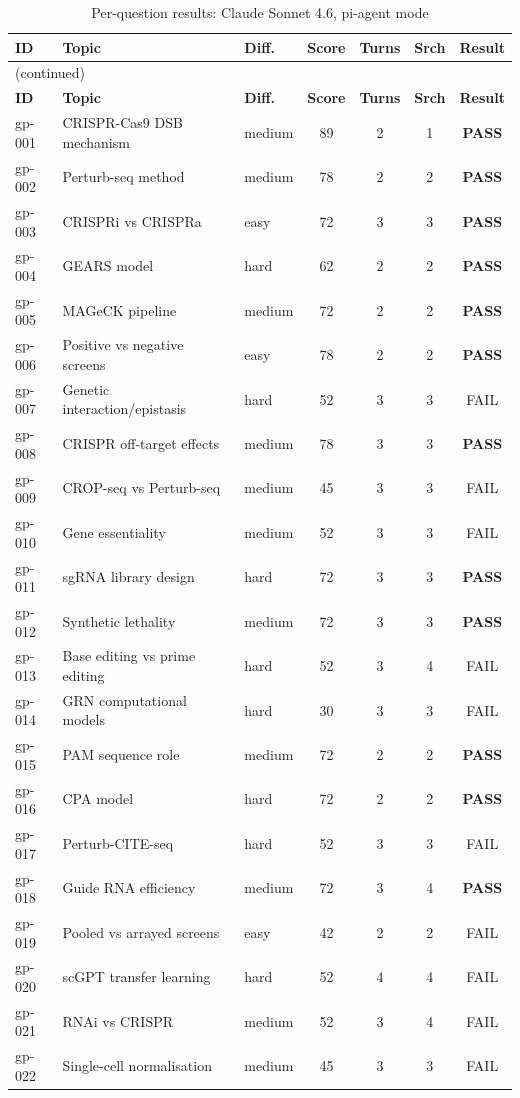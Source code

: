 \documentclass[12pt, a4paper]{article}
\begin{document}
\begin{longtable}{@{}lp{4.2cm}lcccc@{}}
\caption{Per-question results: Claude Sonnet 4.6, pi-agent mode} \label{tab:results} \\
\toprule
\textbf{ID} & \textbf{Topic} & \textbf{Diff.} & \textbf{Score} & \textbf{Turns} & \textbf{Srch} & \textbf{Result} \\
\midrule
\endfirsthead
\multicolumn{7}{l}{\small(continued)}\\
\toprule
\textbf{ID} & \textbf{Topic} & \textbf{Diff.} & \textbf{Score} & \textbf{Turns} & \textbf{Srch} & \textbf{Result} \\
\midrule
\endhead
\bottomrule
\endfoot
gp-001 & CRISPR-Cas9 DSB mechanism   & medium & 89 & 2 & 1 & \textbf{PASS} \\
gp-002 & Perturb-seq method          & medium & 78 & 2 & 2 & \textbf{PASS} \\
gp-003 & CRISPRi vs CRISPRa          & easy   & 72 & 3 & 3 & \textbf{PASS} \\
gp-004 & GEARS model                 & hard   & 62 & 2 & 2 & \textbf{PASS} \\
gp-005 & MAGeCK pipeline             & medium & 72 & 2 & 2 & \textbf{PASS} \\
gp-006 & Positive vs negative screens& easy   & 78 & 2 & 2 & \textbf{PASS} \\
gp-007 & Genetic interaction/epistasis& hard  & 52 & 3 & 3 & FAIL \\
gp-008 & CRISPR off-target effects   & medium & 78 & 3 & 3 & \textbf{PASS} \\
gp-009 & CROP-seq vs Perturb-seq     & medium & 45 & 3 & 3 & FAIL \\
gp-010 & Gene essentiality           & medium & 52 & 3 & 3 & FAIL \\
gp-011 & sgRNA library design        & hard   & 72 & 3 & 3 & \textbf{PASS} \\
gp-012 & Synthetic lethality         & medium & 72 & 3 & 3 & \textbf{PASS} \\
gp-013 & Base editing vs prime editing& hard  & 52 & 3 & 4 & FAIL \\
gp-014 & GRN computational models    & hard   & 30 & 3 & 3 & FAIL \\
gp-015 & PAM sequence role           & medium & 72 & 2 & 2 & \textbf{PASS} \\
gp-016 & CPA model                   & hard   & 72 & 2 & 2 & \textbf{PASS} \\
gp-017 & Perturb-CITE-seq            & hard   & 52 & 3 & 3 & FAIL \\
gp-018 & Guide RNA efficiency        & medium & 72 & 3 & 4 & \textbf{PASS} \\
gp-019 & Pooled vs arrayed screens   & easy   & 42 & 2 & 2 & FAIL \\
gp-020 & scGPT transfer learning     & hard   & 52 & 4 & 4 & FAIL \\
gp-021 & RNAi vs CRISPR              & medium & 52 & 3 & 4 & FAIL \\
gp-022 & Single-cell normalisation   & medium & 45 & 3 & 3 & FAIL \\
\end{longtable}
\end{document}
